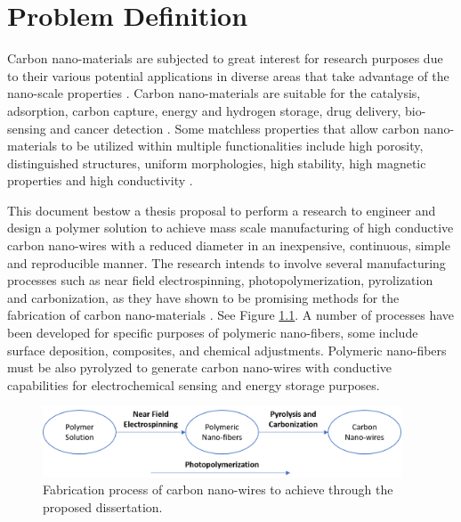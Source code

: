 \chapter{Problem Definition} %

\label{Chapter:ProblemDefinitionandMotivation}

Carbon nano-materials are subjected to great interest for research purposes due to their various potential applications in diverse areas that take advantage of the nano-scale properties \cite{Siddiqui2019}. Carbon nano-materials are suitable for the catalysis, adsorption, carbon capture, energy and hydrogen storage, drug delivery, bio-sensing and cancer detection \cite{Siddiqui2019}. Some matchless properties that allow carbon nano-materials to be utilized within multiple functionalities include high porosity, distinguished structures, uniform morphologies, high stability, high magnetic properties and high conductivity \cite{Siddiqui2019}.

This document bestow a thesis proposal to perform a research to engineer and design a polymer solution to achieve mass scale manufacturing of high conductive carbon nano-wires with a reduced diameter in an inexpensive, continuous, simple and reproducible manner. The research intends to involve several manufacturing processes such as near field electrospinning, photopolymerization, pyrolization and carbonization, as they have shown to be promising methods for the fabrication of carbon nano-materials \cite{Cardenas2017}. See Figure \ref{fig:fabricationFlowChart}. A number of processes have been developed for specific purposes of polymeric nano-fibers, some include surface deposition, composites, and chemical adjustments. Polymeric nano-fibers must be also pyrolyzed to generate carbon nano-wires with conductive capabilities \cite{Madou2011} for electrochemical sensing and energy storage purposes.

\begin{figure}[th]
\centering
\includegraphics[width=0.95\textwidth]{./Figures/FabricationProcess.png}
\decoRule
\caption[Carbon Nano-wires Fabrication Process]{Fabrication process of carbon nano-wires to achieve through the proposed dissertation.}
\label{fig:fabricationFlowChart}
\end{figure}

